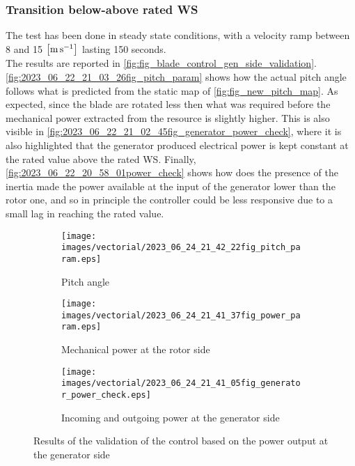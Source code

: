 \subsubsection{Transition below-above rated WS}
The test has been done in steady state conditions, with a velocity ramp between 8 and 15 $\left[\si{\meter\per\second}\right]$ lasting 150 seconds.\\
The results are reported in \autoref{fig:fig_blade_control_gen_side_validation}. \autoref{fig:2023_06_22_21_03_26fig_pitch_param} shows how the actual pitch angle follows what is predicted from the static map of \autoref{fig:fig_new_pitch_map}. As expected, since the blade are rotated less then what was required before the mechanical power extracted from the resource is slightly higher. This is also visible in \autoref{fig:2023_06_22_21_02_45fig_generator_power_check}, where it is also highlighted that the generator produced electrical power is kept constant at the rated value above the rated WS. Finally, \autoref{fig:2023_06_22_20_58_01power_check} shows how does the presence of the inertia made the power available at the input of the generator lower than the rotor one, and so in principle the controller could be less responsive due to a small lag in reaching the rated value. 
\begin{figure}[htb]
  \begin{subfigure}{0.5\textwidth}
    \centering
    \texttt{[image: images/vectorial/2023\_06\_24\_21\_42\_22fig\_pitch\_param.eps]}
    \caption{Pitch angle}
    \label{fig:2023_06_22_21_03_26fig_pitch_param}
  \end{subfigure}
  \begin{subfigure}{0.5\textwidth}
    \centering
    \texttt{[image: images/vectorial/2023\_06\_24\_21\_41\_37fig\_power\_param.eps]}
    \caption{Mechanical power at the rotor side}
    \label{fig:2023_06_22_21_03_05fig_power_param}
  \end{subfigure}
  \begin{subfigure}{0.5\textwidth}
    \centering
    \texttt{[image: images/vectorial/2023\_06\_24\_21\_41\_05fig\_generator\_power\_check.eps]}
    \caption{Incoming and outgoing power at the generator side}
    \label{fig:2023_06_22_21_02_45fig_generator_power_check}
  \end{subfigure}
  \caption{Results of the validation of the control based on the power output at the generator side}
  \label{fig:fig_blade_control_gen_side_validation}
\end{figure}
\newpage